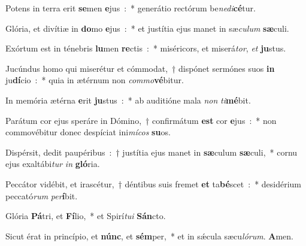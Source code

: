 ﻿\item Potens in terra erit \textbf{se}\-men \textbf{e}jus~:~* generátio rectórum be\emph{ne}\emph{di}\textbf{cé}tur.
\item Glória, et divítiæ in \textbf{do}\-mo \textbf{e}jus~:~* et justítia ejus manet in sæ\emph{cu}\-\emph{lum} \textbf{sæ}culi.
\item Exórtum est in ténebris \textbf{lu}\-men \textbf{re}\-ctis~:~* miséricors, et miserá\emph{tor}, \emph{et} \textbf{ju}stus.
\item Jucúndus homo qui miserétur et cómmodat,~† dispónet sermónes suos \textbf{in} ju\textbf{dí}\-cio~:~* quia in ætérnum non \emph{com}\emph{mo}\textbf{vé}bitur.
\item In memória ætérna \textbf{e}\-rit \textbf{ju}\-stus~:~* ab auditióne mala \emph{non} \emph{ti}\textbf{mé}bit.
\item Parátum cor ejus speráre in Dómino,~† confirmátum \textbf{est} cor \textbf{e}jus~:~* non commovébitur donec despíciat ini\emph{mí}\-\emph{cos} \textbf{su}os.
\item Dispérsit, dedit paupéribus~:~† justítia ejus manet in \textbf{sæ}\-culum \textbf{sæ}\-culi,~* cornu ejus exaltábi\emph{tur} \emph{in} \textbf{gló}ria.
\item Peccátor vidébit, et irascétur,~† déntibus suis fremet \textbf{et} ta\textbf{bé}\-scet~:~* desidérium peccató\emph{rum} \emph{per}\textbf{í}bit.
\item Glória \textbf{Pá}\-tri, et \textbf{Fí}\-lio,~* et Spirí\emph{tu}\-\emph{i} \textbf{Sán}cto.
\item Sicut érat in princípio, et \textbf{núnc}, et \textbf{sém}\-per,~* et in sǽcula sæcu\emph{ló}\-\emph{rum}. \textbf{A}men.